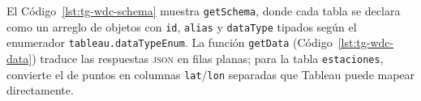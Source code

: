 El Código~\ref{lst:tg-wdc-schema} muestra \texttt{getSchema}, donde cada tabla
se declara como un arreglo de objetos con \texttt{id}, \texttt{alias} y
\texttt{dataType} tipados según el enumerador \texttt{tableau.dataTypeEnum}. La
función \texttt{getData} (Código~\ref{lst:tg-wdc-data}) traduce las respuestas
\textsc{json} en filas planas; para la tabla \texttt{estaciones}, convierte el
\geojson{} de puntos en columnas \texttt{lat}/\texttt{lon} separadas que Tableau
puede mapear directamente.




